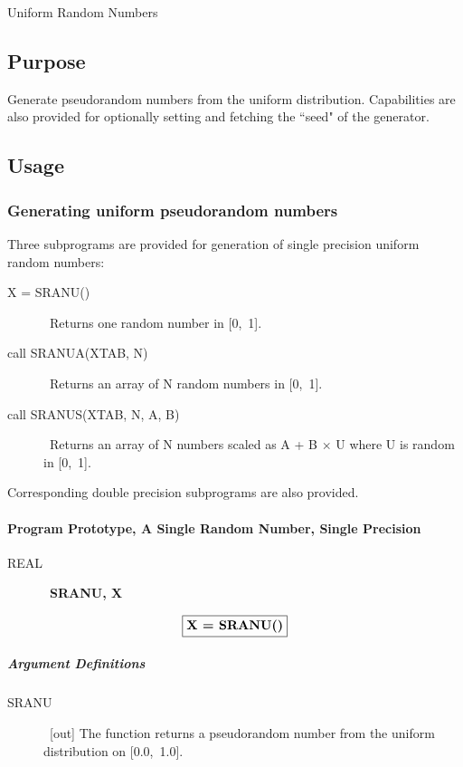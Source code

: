 \documentclass[twoside]{MATH77}
\begin{document}
 Uniform Random Numbers


\subsection{Purpose}

Generate pseudorandom numbers from the uniform distribution. Capabilities
are also provided for optionally setting and fetching the ``seed" of the
generator.

\subsection{Usage}

\subsubsection{Generating uniform pseudorandom numbers}

Three subprograms are provided for generation of single precision uniform
random numbers:

\begin{description}
\item[X = SRANU()]  \ Returns one random number in [0,~1].

\item[call SRANUA(XTAB, N)]  \ Returns an array of N random numbers in
[0,~1].

\item[call SRANUS(XTAB, N, A, B)]  \ Returns an array of N numbers scaled
as A + B $\times $ U where U is random in [0,~1].
\end{description}

Corresponding double precision subprograms are also provided.

\paragraph{Program Prototype, A Single Random Number, Single Precision}

\begin{description}
\item[REAL]  \ {\bf SRANU, X}
\end{description}
$$
\fbox{{\bf X = SRANU()}}
$$
\subparagraph{Argument Definitions}

\begin{description}
\item[SRANU]  \ [out] The function returns a pseudorandom number from the
uniform distribution on [0.0,~1.0].
\end{description}
\end{document}
